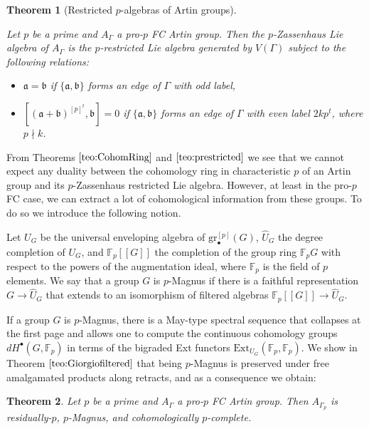 \documentclass[10pt, oneside]{amsart}
\theoremstyle{definition}
\theoremstyle{remark}
\theoremstyle{plain}
\newtheorem{teoInt}{Theorem}
\begin{document}
\begin{teoInt}[Restricted $p$-algebras of Artin groups]
\label{teo:prestricted}
{\sl Let $p$ be a prime and $A_\Gamma$ a pro-$p$ FC Artin group. Then the $p$-Zassenhaus Lie algebra of $A_\Gamma$ is the $p$-restricted Lie algebra generated by $V(\Gamma)$ subject to the following relations:
\begin{itemize}
\item[1)] $\mathfrak{a} = \mathfrak{b}$ if $\{\mathfrak{a},\mathfrak{b}\}$ forms an edge of $\Gamma$ with odd label,

\item[2)] $[(\mathfrak{a}+\mathfrak{b})^{[p]^t}, \mathfrak{b}] = 0$ if $\{\mathfrak{a},\mathfrak{b}\}$ forms an edge of $\Gamma$ with even label $2kp^t$, where $p \nmid k$.
\end{itemize}}
\end{teoInt}

From Theorems $\ref{teo:CohomRing}$ and $\ref{teo:prestricted}$ we see that we cannot expect any duality between the cohomology ring in characteristic $p$ of an Artin group and its $p$-Zassenhaus restricted Lie algebra. However, at least in the pro-$p$ FC case, we can extract a lot of cohomological information from these groups. To do so we introduce the following notion.

Let $U_G$ be the universal enveloping algebra of $\mathrm{gr}^{[p]}_\bullet(G)$, $\hat{U}_G$ the degree completion of $U_G$, and $\mathbb{F}_p[[G]]$ the completion of the group ring $\mathbb{F}_p G$ with respect to the powers of the augmentation ideal, where $\mathbb{F}_p$ is the field of $p$ elements. We say that a group $G$ is $p$-Magnus if there is a faithful representation
$G \to \hat{U}_G$
that extends to an isomorphism of filtered algebras
$\mathbb{F}_p[[G]] \to \hat{U}_G$.

If a group $G$ is $p$-Magnus, there is a May-type spectral sequence that collapses at the first page and allows one to compute the continuous cohomology groups $dH^\bullet(G,\mathbb{F}_p)$ in terms of the bigraded Ext functors $\mathrm{Ext}_{U_G}(\mathbb{F}_p,\mathbb{F}_p)$. We show in Theorem $\ref{teo:Giorgiofiltered}$ that being $p$-Magnus is preserved under free amalgamated products along retracts, and as a consequence we obtain:

\begin{teoInt}
\label{teo:filtered}
{\sl Let $p$ be a prime and $A_\Gamma$ a pro-$p$ FC Artin group. Then $A_{\Gamma_p}$ is residually-$p$, $p$-Magnus, and cohomologically $p$-complete.}
\end{teoInt}
\end{document}

